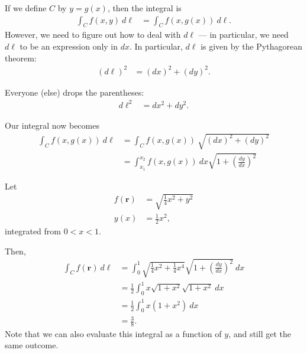 \documentclass[10pt]{mypackage}
\begin{document}
If we define $C$ by $y = g(x)$, then the integral is
\begin{align*}
  \int_{C}^{} f(x,y)\:d\ell &= \int_{C}^{} f\left(x,g(x)\right)\:d\ell.
\end{align*}
However, we need to figure out how to deal with $d\ell$ --- in particular, we need $d\ell$ to be an expression only in $dx$. In particular, $d\ell$ is given by the Pythagorean theorem:
\begin{align*}
  \left(d\ell\right)^2 &= \left(dx\right)^2 + \left(dy\right)^2.
\end{align*}
\begin{notation}
  Everyone (else) drops the parentheses:
  \begin{align*}
    d\ell^2 &= dx^2 + dy^2.
  \end{align*}
\end{notation}
Our integral now becomes
\begin{align*}
  \int_{C}^{} f\left(x,g(x)\right)\:d\ell &= \int_{C}^{} f\left(x,g(x)\right)\:\sqrt{\left(dx\right)^2 + \left(dy\right)^2}\\
                                          &= \int_{x_1}^{x_2} f\left(x,g(x)\right)\:dx\sqrt{1 + \left(\frac{dy}{dx}\right)^2}
\end{align*}
\begin{example}
  Let
  \begin{align*}
    f\left(\mathbf{r}\right) &= \sqrt{\frac{1}{4}x^2 + y^2}\\
    y(x) &= \frac{1}{2}x^2,
  \end{align*}
  integrated from $0 < x < 1$.\newline

  Then,
  \begin{align*}
    \int_{C}^{} f\left(\mathbf{r}\right)\:d\ell &= \int_{0}^{1} \sqrt{\frac{1}{4}x^2 + \frac{1}{4}x^4}\sqrt{1 + \left(\frac{dy}{dx}\right)^2}\:dx\\
                                                &= \frac{1}{2}\int_{0}^{1} x\sqrt{1 + x^2}\sqrt{1 + x^2}\:dx\\
                                                &= \frac{1}{2}\int_{0}^{1} x\left(1 + x^2\right)\:dx\\
                                                &= \frac{3}{8}.
  \end{align*}
  Note that we can also evaluate this integral as a function of $y$, and still get the same outcome.
\end{example}
\end{document}
